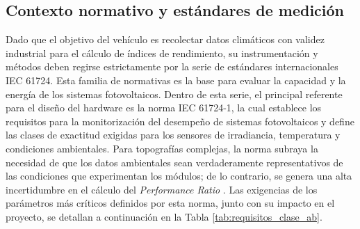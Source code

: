 \subsection{Contexto normativo y estándares de medición} 
Dado que el objetivo del vehículo es recolectar datos climáticos con validez industrial para el cálculo de índices de rendimiento, su instrumentación y métodos deben regirse estrictamente por la serie de estándares internacionales IEC 61724. Esta familia de normativas es la base para evaluar la capacidad y la energía de los sistemas fotovoltaicos. Dentro de esta serie, el principal referente para el diseño del hardware es la norma IEC 61724-1, la cual establece los requisitos para la monitorización del desempeño de sistemas fotovoltaicos y define las clases de exactitud exigidas para los sensores de irradiancia, temperatura y condiciones ambientales. Para topografías complejas, la norma subraya la necesidad de que los datos ambientales sean verdaderamente representativos de las condiciones que experimentan los módulos; de lo contrario, se genera una alta incertidumbre en el cálculo del \textit{Performance Ratio} \citep{IEC61724-1_2021}. Las exigencias de los parámetros más críticos definidos por esta norma, junto con su impacto en el proyecto, se detallan a continuación en la Tabla \ref{tab:requisitos_clase_ab}.




